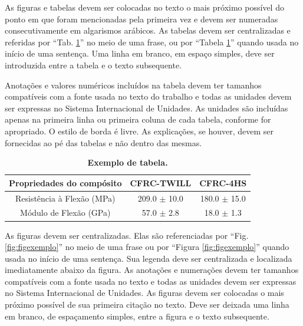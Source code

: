 \documentclass[10pt,fleqn,a4paper,twoside]{article}
\begin{document}
        As figuras e tabelas devem ser colocadas no texto o mais próximo possível do ponto em que foram mencionadas pela primeira vez e devem ser numeradas consecutivamente em algarismos arábicos. As tabelas devem ser centralizadas e referidas por ``Tab. \ref{tab:tabexemplo}'' no meio de uma frase, ou por ``Tabela \ref{tab:tabexemplo}'' quando usada no início de uma sentença. Uma linha em branco, em espaço simples, deve ser introduzida entre a tabela e o texto subsequente.
        
        Anotações e valores numéricos incluídos na tabela devem ter tamanhos compatíveis com a fonte usada no texto do trabalho e todas as unidades devem ser expressas no Sistema Internacional de Unidades. As unidades são incluídas apenas na primeira linha ou primeira coluna de cada tabela, conforme for apropriado. O estilo de borda é livre. As explicações, se houver, devem ser fornecidas ao pé das tabelas e não dentro das mesmas.

        \begin{table}[ht]
            \begin{center}
                \caption{\textbf{Exemplo de tabela.}}
                    \begin{tabular}{c|c|c}
                    \hline
                    Propriedades do compósito       & CFRC-TWILL        & CFRC-4HS         \\
                    \hline
                    Resistência à Flexão  (MPa)     & 209.0 $\pm$ 10.0       & 180.0 $\pm$  15.0    \\
                    \hline
                    Módulo de Flexão  (GPa)         & 57.0 $\pm$ 2.8    & 18.0 $\pm$  1.3  \\
                    \hline
                    \end{tabular} \label{tab:tabexemplo}
            \end{center}
        \end{table}

        As figuras devem ser centralizadas. Elas são referenciadas por ``Fig. \ref{fig:figexemplo}'' no meio de uma frase ou por ``Figura \ref{fig:figexemplo}'' quando usada no início de uma sentença. Sua legenda deve ser centralizada e localizada imediatamente abaixo da figura. As anotações e numerações devem ter tamanhos compatíveis com a fonte usada no texto e todas as unidades devem ser expressas no Sistema Internacional de Unidades. As figuras devem ser colocadas o mais próximo possível de sua primeira citação no texto. Deve ser deixada uma linha em branco, de espaçamento simples, entre a figura e o texto subsequente.
    
\end{document}
